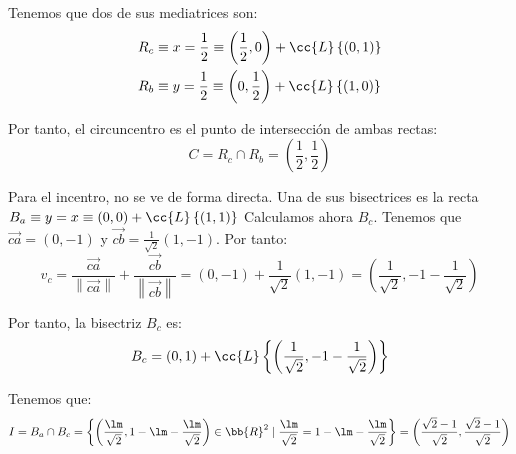 \begin{ejercicio}
    Tenemos que dos de sus mediatrices son:
    \begin{align*}
        R_c & \equiv x=\frac{1}{2} \equiv \left(\frac{1}{2}, 0\right) + \cc{L}\left\{(0,1)\right\}\\
        R_b & \equiv y=\frac{1}{2} \equiv \left(0, \frac{1}{2}\right) + \cc{L}\left\{(1,0)\right\}
    \end{align*}

    Por tanto, el circuncentro es el punto de intersección de ambas rectas:
    \begin{equation*}
        C=R_c \cap R_b = \left(\frac{1}{2}, \frac{1}{2}\right)
    \end{equation*}

    Para el incentro, no se ve de forma directa. Una de sus bisectrices es la recta $B_a \equiv y=x \equiv (0,0) + \cc{L}\left\{(1,1)\right\}$
    Calculamos ahora $B_c$. Tenemos que $\vec{ca} = (0,-1)$ y $\vec{cb} = \frac{1}{\sqrt{2}}(1,-1)$. Por tanto:
    \begin{equation*}
        v_c = \frac{\vec{ca}}{\left\|\vec{ca}\right\|} + \frac{\vec{cb}}{\left\|\vec{cb}\right\|} = (0,-1) + \frac{1}{\sqrt{2}}(1,-1) = \left(\frac{1}{\sqrt{2}}, -1-\frac{1}{\sqrt{2}}\right)
    \end{equation*}

    Por tanto, la bisectriz $B_c$ es:
    \begin{equation*}
        B_c = (0,1) + \cc{L}\left\{\left(\frac{1}{\sqrt{2}}, -1-\frac{1}{\sqrt{2}}\right)\right\}
    \end{equation*}

    Tenemos que:
    \begin{equation*}
        I=B_a\cap B_c = \left\{\left(\frac{\lm}{\sqrt{2}}, 1-\lm -\frac{\lm}{\sqrt{2}}\right)\in \bb{R}^2 \mid \frac{\lm}{\sqrt{2}} = 1 -\lm -\frac{\lm}{\sqrt{2}}\right\}
        = \left(\frac{\sqrt{2}-1}{\sqrt{2}},\frac{\sqrt{2}-1}{\sqrt{2}}\right)
    \end{equation*}
\end{ejercicio}

